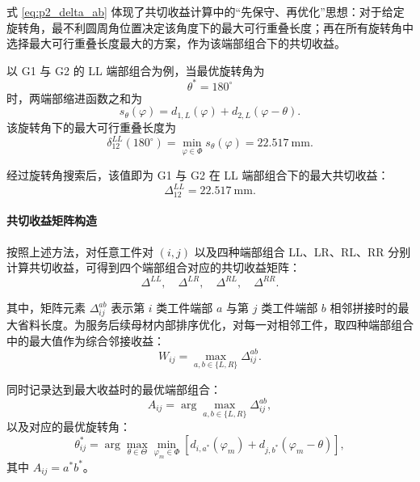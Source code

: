 \documentclass[UTF8]{ctexart}
\begin{document}
式 \eqref{eq:p2_delta_ab} 体现了共切收益计算中的“先保守、再优化”思想：对于给定旋转角，最不利圆周角位置决定该角度下的最大可行重叠长度；再在所有旋转角中选择最大可行重叠长度最大的方案，作为该端部组合下的共切收益。

以 G1 与 G2 的 LL 端部组合为例，当最优旋转角为
\[
\theta^{*}=180^\circ
\]
时，两端部缩进函数之和为
\[
s_{\theta}(\varphi)
=
d_{1,L}(\varphi)+d_{2,L}(\varphi-\theta).
\]
该旋转角下的最大可行重叠长度为
\begin{equation}
\delta_{12}^{LL}(180^\circ)
=
\min_{\varphi\in\Phi}s_{\theta}(\varphi)
=
22.517\ \mathrm{mm}.
\label{eq:p2_example_delta}
\end{equation}

经过旋转角搜索后，该值即为 G1 与 G2 在 LL 端部组合下的最大共切收益：
\begin{equation}
\Delta_{12}^{LL}=22.517\ \mathrm{mm}.
\label{eq:p2_example_benefit}
\end{equation}

\paragraph{共切收益矩阵构造}

按照上述方法，对任意工件对 $(i,j)$ 以及四种端部组合 LL、LR、RL、RR 分别计算共切收益，可得到四个端部组合对应的共切收益矩阵：
\begin{equation}
\Delta^{LL},\quad
\Delta^{LR},\quad
\Delta^{RL},\quad
\Delta^{RR}.
\label{eq:p2_delta_matrices}
\end{equation}

其中，矩阵元素 $\Delta_{ij}^{ab}$ 表示第 $i$ 类工件端部 $a$ 与第 $j$ 类工件端部 $b$ 相邻拼接时的最大省料长度。为服务后续母材内部排序优化，对每一对相邻工件，取四种端部组合中的最大值作为综合邻接收益：
\begin{equation}
W_{ij}
=
\max_{a,b\in\{L,R\}}
\Delta_{ij}^{ab}.
\label{eq:p2_W}
\end{equation}

同时记录达到最大收益时的最优端部组合：
\begin{equation}
A_{ij}
=
\arg\max_{a,b\in\{L,R\}}
\Delta_{ij}^{ab},
\label{eq:p2_A}
\end{equation}
以及对应的最优旋转角：
\begin{equation}
\theta_{ij}^{*}
=
\arg\max_{\theta\in\Theta}
\min_{\varphi_m\in\Phi}
\left[
d_{i,a^*}(\varphi_m)+d_{j,b^*}(\varphi_m-\theta)
\right],
\label{eq:p2_theta_star}
\end{equation}
其中 $A_{ij}=a^*b^*$。
\end{document}
